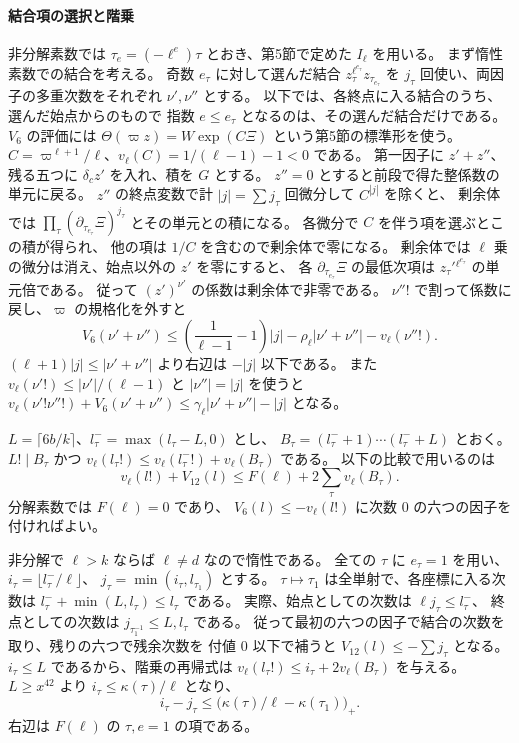 \paragraph{結合項の選択と階乗}
非分解素数では \(\tau_e=(-\ell^e)\tau\) とおき、第5節で定めた \(I_\ell\) を用いる。
まず惰性素数での結合を考える。
奇数 \(e_\tau\) に対して選んだ結合 \(z_\tau^{\ell^{e_\tau}}z_{\tau_{e_\tau}}\)
を \(j_\tau\) 回使い、両因子の多重次数をそれぞれ \(\nu',\nu''\) とする。
以下では、各終点に入る結合のうち、選んだ始点からのもので
指数 \(e\le e_\tau\) となるのは、その選んだ結合だけである。
\(V_6\) の評価には \(\Theta(\varpi z)=W\exp(C\Xi)\) という第5節の標準形を使う。
\(C=\varpi^{\ell+1}/\ell\)、\(v_\ell(C)=1/(\ell-1)-1<0\) である。
第一因子に \(z'+z''\)、残る五つに \(\delta_c z'\) を入れ、積を \(G\) とする。
\(z''=0\) とすると前段で得た整係数の単元に戻る。
\(z''\) の終点変数で計 \(|j|=\sum j_\tau\) 回微分して \(C^{|j|}\) を除くと、
剰余体では \(\prod_\tau(\partial_{\tau_{e_\tau}}\Xi)^{j_\tau}\) とその単元との積になる。
各微分で \(C\) を伴う項を選ぶとこの積が得られ、
他の項は \(1/C\) を含むので剰余体で零になる。
剰余体では \(\ell\) 乗の微分は消え、始点以外の \(z'\) を零にすると、
各 \(\partial_{\tau_{e_\tau}}\Xi\) の最低次項は
\(z_\tau'{}^{\ell^{e_\tau}}\) の単元倍である。
従って \((z')^{\nu'}\) の係数は剰余体で非零である。
\(\nu''!\) で割って係数に戻し、\(\varpi\) の規格化を外すと
\begin{equation}\label{eq:attain-coupling}
 V_6(\nu'+\nu'')
 \le \left(\frac1{\ell-1}-1\right)|j|
      -\rho_\ell|\nu'+\nu''|-v_\ell(\nu''!).
\end{equation}
\((\ell+1)|j|\le|\nu'+\nu''|\) より右辺は \(-|j|\) 以下である。
また \(v_\ell(\nu'!)\le|\nu'|/(\ell-1)\) と
\(|\nu''|=|j|\) を使うと
\(v_\ell(\nu'!\nu''!)+V_6(\nu'+\nu'')\le
\gamma_\ell|\nu'+\nu''|-|j|\) となる。

\(L=\lceil6b/k\rceil\)、\(l_\tau^-=\max(l_\tau-L,0)\) とし、
\(B_\tau=(l_\tau^-+1)\cdots(l_\tau^-+L)\) とおく。
\(L!\mid B_\tau\) かつ
\(v_\ell(l_\tau!)\le v_\ell(l_\tau^-!)+v_\ell(B_\tau)\) である。
以下の比較で用いるのは
\begin{equation}\label{eq:attain-twelve}
 v_\ell(l!)+V_{12}(l)\le F(\ell)+2\sum_\tau v_\ell(B_\tau).
\end{equation}
分解素数では \(F(\ell)=0\) であり、
\(V_6(l)\le-v_\ell(l!)\) に次数 \(0\) の六つの因子を付ければよい。

非分解で \(\ell>k\) ならば \(\ell\ne d\) なので惰性である。
全ての \(\tau\) に \(e_\tau=1\) を用い、
\(i_\tau=\lfloor l_\tau^-/\ell\rfloor\)、
\(j_\tau=\min(i_\tau,l_{\tau_1})\) とする。
\(\tau\mapsto\tau_1\) は全単射で、各座標に入る次数は
\(l_\tau^-+\min(L,l_\tau)\le l_\tau\) である。
実際、始点としての次数は \(\ell j_\tau\le l_\tau^-\)、
終点としての次数は \(j_{\tau_1^{-1}}\le L,l_\tau\) である。
従って最初の六つの因子で結合の次数を取り、残りの六つで残余次数を
付値 \(0\) 以下で補うと \(V_{12}(l)\le-\sum j_\tau\) となる。
\(i_\tau\le L\) であるから、階乗の再帰式は
\(v_\ell(l_\tau!)\le i_\tau+2v_\ell(B_\tau)\) を与える。
\(L\ge x^{42}\) より \(i_\tau\le\kappa(\tau)/\ell\) となり、
\[
 i_\tau-j_\tau\le
   \bigl(\kappa(\tau)/\ell-\kappa(\tau_1)\bigr)_+ .
\]
右辺は \(F(\ell)\) の \(\tau,e=1\) の項である。

